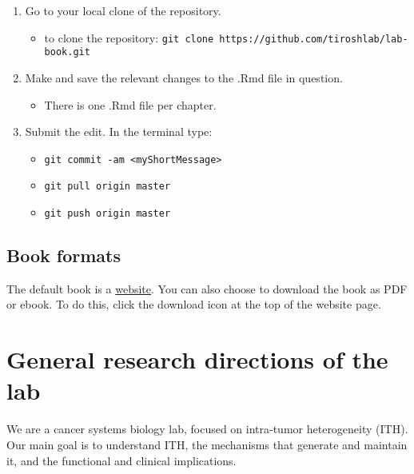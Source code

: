 \documentclass[
]{book}
\providecommand{\tightlist}{%
  \setlength{\itemsep}{0pt}\setlength{\parskip}{0pt}}
\begin{document}
\begin{enumerate}
\def\labelenumi{\arabic{enumi}.}
\tightlist
\item
  Go to your local clone of the repository.

  \begin{itemize}
  \tightlist
  \item
    to clone the repository: \texttt{git\ clone\ https://github.com/tiroshlab/lab-book.git}\\
  \end{itemize}
\item
  Make and save the relevant changes to the .Rmd file in question.

  \begin{itemize}
  \tightlist
  \item
    There is one .Rmd file per chapter.
  \end{itemize}
\item
  Submit the edit. In the terminal type:

  \begin{itemize}
  \tightlist
  \item
    \texttt{git\ commit\ -am\ \textless{}myShortMessage\textgreater{}}
  \item
    \texttt{git\ pull\ origin\ master}
  \item
    \texttt{git\ push\ origin\ master}
  \end{itemize}
\end{enumerate}

\hypertarget{book-formats}{%
\section{Book formats}\label{book-formats}}

The default book is a \href{https://tiroshlab.github.io/lab-book}{website}. You can also choose to download the book as PDF or ebook. To do this, click the download icon at the top of the website page.

\hypertarget{general}{%
\chapter{General research directions of the lab}\label{general}}

We are a cancer systems biology lab, focused on intra-tumor heterogeneity (ITH). Our main goal is to understand ITH, the mechanisms that generate and maintain it, and the functional and clinical implications.
\end{document}
